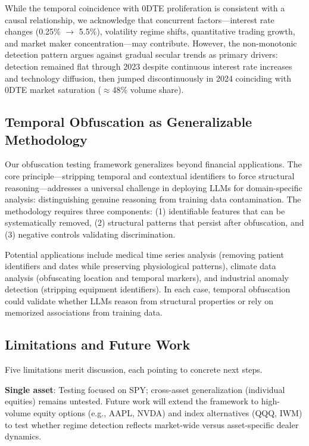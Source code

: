 While the temporal coincidence with 0DTE proliferation is consistent with a causal relationship, we acknowledge that concurrent factors---interest rate changes (0.25\% $\rightarrow$ 5.5\%), volatility regime shifts, quantitative trading growth, and market maker concentration---may contribute. However, the non-monotonic detection pattern argues against gradual secular trends as primary drivers: detection remained flat through 2023 despite continuous interest rate increases and technology diffusion, then jumped discontinuously in 2024 coinciding with 0DTE market saturation ($\approx$48\% volume share).

\subsection{Temporal Obfuscation as Generalizable Methodology}

Our obfuscation testing framework generalizes beyond financial applications. The core principle---stripping temporal and contextual identifiers to force structural reasoning---addresses a universal challenge in deploying LLMs for domain-specific analysis: distinguishing genuine reasoning from training data contamination. The methodology requires three components: (1) identifiable features that can be systematically removed, (2) structural patterns that persist after obfuscation, and (3) negative controls validating discrimination.

Potential applications include medical time series analysis (removing patient identifiers and dates while preserving physiological patterns), climate data analysis (obfuscating location and temporal markers), and industrial anomaly detection (stripping equipment identifiers). In each case, temporal obfuscation could validate whether LLMs reason from structural properties or rely on memorized associations from training data.

\subsection{Limitations and Future Work}

Five limitations merit discussion, each pointing to concrete next steps.

\noindent\textbf{Single asset}: Testing focused on SPY; cross-asset generalization (individual equities) remains untested. Future work will extend the framework to high-volume equity options (e.g., AAPL, NVDA) and index alternatives (QQQ, IWM) to test whether regime detection reflects market-wide versus asset-specific dealer dynamics.


